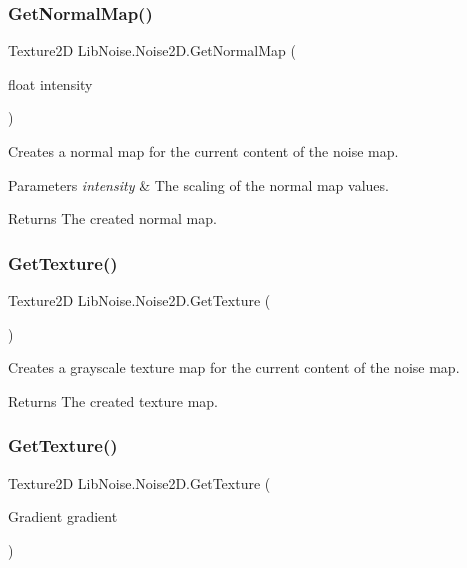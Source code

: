 \subsubsection{\texorpdfstring{Get\+Normal\+Map()}{GetNormalMap()}}
{\footnotesize\ttfamily Texture2D Lib\+Noise.\+Noise2\+D.\+Get\+Normal\+Map (\begin{DoxyParamCaption}\item[{float}]{intensity }\end{DoxyParamCaption})}



Creates a normal map for the current content of the noise map. 


\begin{DoxyParams}{Parameters}
{\em intensity} & The scaling of the normal map values.\\
\hline
\end{DoxyParams}
\begin{DoxyReturn}{Returns}
The created normal map.
\end{DoxyReturn}
\mbox{\label{class_lib_noise_1_1_noise2_d_a8f5efbd701d1f20f2a9a6c0631283749}} 
\subsubsection{\texorpdfstring{Get\+Texture()}{GetTexture()}\hspace{0.1cm}{\footnotesize\ttfamily [1/2]}}
{\footnotesize\ttfamily Texture2D Lib\+Noise.\+Noise2\+D.\+Get\+Texture (\begin{DoxyParamCaption}{ }\end{DoxyParamCaption})}



Creates a grayscale texture map for the current content of the noise map. 

\begin{DoxyReturn}{Returns}
The created texture map.
\end{DoxyReturn}
\mbox{\label{class_lib_noise_1_1_noise2_d_ac378ab504b642e6da63ae4e3c3384b4f}} 
\subsubsection{\texorpdfstring{Get\+Texture()}{GetTexture()}\hspace{0.1cm}{\footnotesize\ttfamily [2/2]}}
{\footnotesize\ttfamily Texture2D Lib\+Noise.\+Noise2\+D.\+Get\+Texture (\begin{DoxyParamCaption}\item[{Gradient}]{gradient }\end{DoxyParamCaption})}



